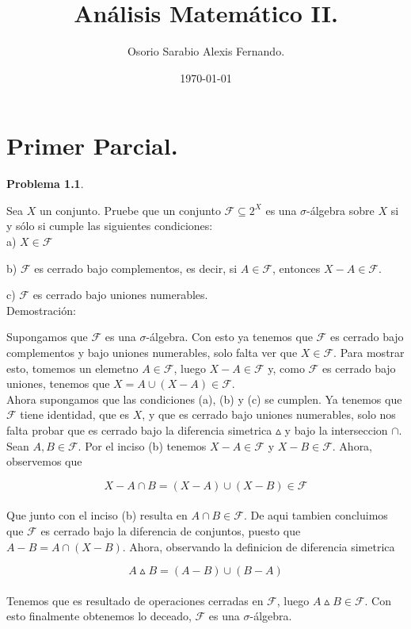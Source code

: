 \documentclass[12pt]{article}
\author{Osorio Sarabio Alexis Fernando.}
\date{\today}
\title{An\'alisis Matem\'atico II.}
\begin{document}
    
    \maketitle

    \section{Primer Parcial.}

    \textbf{Problema 1.1}. 
    
    Sea $X$ un conjunto. Pruebe que un conjunto $\mathcal{F} \subseteq 2^X$ es una
     $\sigma$-\'algebra sobre $X$ si y s\'olo si cumple las siguientes condiciones:
    \\

    a) $X\in \mathcal{F}$

    b) $\mathcal{F}$ es cerrado bajo complementos, es decir, si $A\in \mathcal{F}$, entonces
    $X-A\in \mathcal{F}$.

    c) $\mathcal{F}$ es cerrado bajo uniones numerables.
    \\

    Demostraci\'on: 
    
    Supongamos que $\mathcal{F}$ es una $\sigma$-\'algebra. Con esto ya 
    tenemos que $\mathcal{F}$ es cerrado bajo complementos y bajo uniones numerables, solo
    falta ver que $X\in \mathcal{F}$. Para mostrar esto, tomemos un elemetno 
    $A\in \mathcal{F}$, luego $X-A\in \mathcal{F}$ y, como $\mathcal{F}$ es cerrado bajo 
    uniones, tenemos que $X = A\cup (X-A) \in \mathcal{F}$.
    \\

    Ahora supongamos que las condiciones (a), (b) y (c) se cumplen. Ya tenemos que 
    $\mathcal{F}$ tiene identidad, que es $X$, y que es cerrado bajo uniones numerables, solo
    nos falta probar que es cerrado bajo la diferencia simetrica $\vartriangle$ y bajo la 
    interseccion $\cap$. Sean $A,B\in \mathcal{F}$. Por el inciso (b) tenemos 
    $X-A\in \mathcal{F}$ y $X-B\in \mathcal{F}$. Ahora, observemos que 

    \[X-A\cap B = (X-A)\cup (X-B) \in \mathcal{F}\]
    \\ 
    Que junto con el inciso (b) resulta en $A\cap B\in \mathcal{F}$. De aqui tambien 
    concluimos que $\mathcal{F}$ es cerrado bajo la diferencia de conjuntos, puesto que 
    $A-B = A\cap (X-B)$. Ahora, observando la definicion de diferencia simetrica 
    
    \[A\vartriangle B = (A-B)\cup (B-A)\]
    \\
    Tenemos que es resultado de operaciones cerradas en $\mathcal{F}$, luego 
    $A\vartriangle B\in \mathcal{F}$. Con esto finalmente obtenemos lo deceado, $\mathcal{F}$
    es una $\sigma$-\'algebra. 
    
\end{document}
